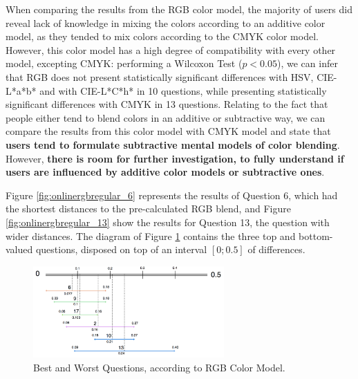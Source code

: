 %
When comparing the results from the RGB color model, the majority of users did reveal lack of knowledge in mixing the colors according to an additive color model, as they tended to mix colors according to the CMYK color model. However, this color
model has a high degree of compatibility with every other model, excepting CMYK: performing a Wilcoxon Test ($p < 0.05$), we can infer that RGB does not present statistically significant differences with HSV, CIE-L*a*b* and with CIE-L*C*h* in 10
questions, while presenting statistically significant differences with CMYK in 13 questions.
Relating to the fact that people either tend to blend colors in an additive or subtractive way, we can compare the results from this color model with CMYK model and state that \textbf{users tend to formulate subtractive mental models of color
blending}. However, \textbf{there is room for further investigation, to fully understand if users are influenced by additive color models or subtractive ones}. \par
%
Figure \ref{fig:onlinergbregular_6} represents the results of Question 6, which had the shortest distances to the pre-calculated RGB blend, and Figure \ref{fig:onlinergbregular_13} show the results for Question 13, the question with wider
distances. The diagram of Figure \ref{fig:rgb_analysis} contains the three top and bottom-valued questions, disposed on top of an interval $[0 ; 0.5]$ of differences. \par
%
\begin{figure}[!htbp]
  \centering
  \vspace{-10pt}
  \includegraphics[width=0.65\textwidth]{images/results/rgb_questions_analysis.png}
  \caption[Best and Worst Questions, according RGB Color Model.]{Best and Worst Questions, according to RGB Color Model.}
  \vspace{-5pt}
  \label{fig:rgb_analysis}
\end{figure}
%
%
